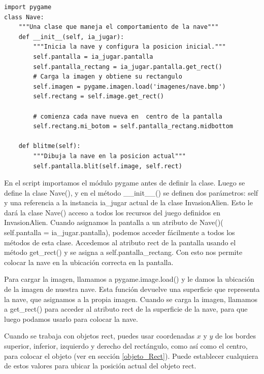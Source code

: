 \hspace{-2.0cm}{\ttfamily \scriptsize nave.py}  \vspace{-0.5cm}
\begin{lstlisting}
import pygame
class Nave:
    """Una clase que maneja el comportamiento de la nave"""
    def __init__(self, ia_jugar):
        """Inicia la nave y configura la posicion inicial."""
        self.pantalla = ia_jugar.pantalla
        self.pantalla_rectang = ia_jugar.pantalla.get_rect()
        # Carga la imagen y obtiene su rectangulo
        self.imagen = pygame.imagen.load('imagenes/nave.bmp')
        self.rectang = self.image.get_rect()
               
        # comienza cada nave nueva en  centro de la pantalla
        self.rectang.mi_botom = self.pantalla_rectang.midbottom
       
    def blitme(self):
        """Dibuja la nave en la posicion actual"""
        self.pantalla.blit(self.image, self.rect)
\end{lstlisting}	
En el script importamos el módulo pygame antes de definir la clase. Luego se define la clase {\ttfamily Nave()}, y en el método  {\ttfamily  \_\_init\_\_()} se  definen dos parámetros: {\ttfamily self} y  una referencia a la instancia  {\ttfamily ia\_jugar}  actual de la clase {\ttfamily InvasionAlien}. Esto le dará  la clase {\ttfamily Nave()}  acceso a todos los recursos del juego definidos en InvasionAlien. Cuando asignamos la pantalla a un atributo de {\ttfamily Nave()}(  {\ttfamily self.pantalla = ia\_jugar.pantalla}),  podemos acceder  fácilmente a todos 
los métodos de esta clase. Accedemos al atributo {\ttfamily rect} de la pantalla usando el método {\ttfamily get\_rect()} y se asigna a {\ttfamily self.pantalla\_rectang}. Con esto nos permite colocar la nave en la ubicación correcta en la pantalla.



Para cargar la imagen, llamamos a {\ttfamily  pygame.image.load()}  y le damos la ubicación de la imagen de nuestra nave. 
Esta función devuelve una superficie que representa la nave, que asignamos a la propia imagen. Cuando se carga la imagen, llamamos a   {\ttfamily  get\_rect()} para acceder al atributo  {\ttfamily rect} de la superficie de la nave, para que luego podamos usarlo para colocar la nave.


Cuando se trabaja con objetos {\ttfamily rect}, puedes usar coordenadas $x$ y
$y$ de los bordes superior, inferior, izquierdo y derecho del rectángulo, como así como el centro, para colocar el objeto  (ver en sección \ref{objeto_Rect}). Puede establecer cualquiera de estos valores para ubicar la posición actual del objeto {\ttfamily rect}. 

